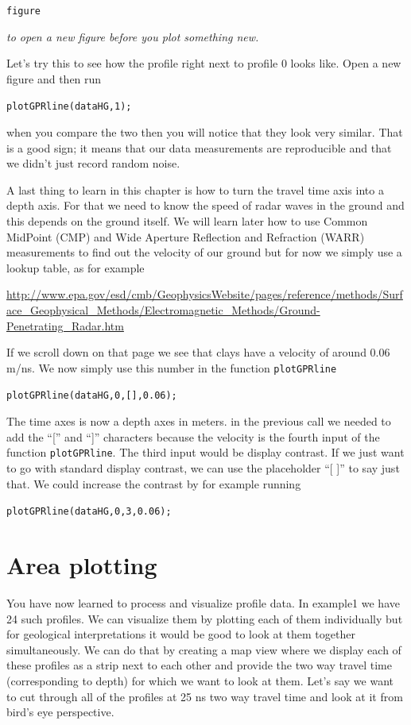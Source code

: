 \documentclass[11pt]{article}
\begin{document}
\qquad \verb#figure#

\emph{to open a new figure before you plot something new.}

Let's try this to see how the profile right next to profile 0 looks
like. Open a new figure and then run

\qquad \verb#plotGPRline(dataHG,1);#
   
when you compare the two then you will notice that they look very
similar. That is a good sign; it means that our data measurements are
reproducible and that we didn't just record random noise.
  
A last thing to learn in this chapter is how to turn the travel time
axis into a depth axis. For that we need to know the speed of radar
waves in the ground and this depends on the ground itself. We will
learn later how to use Common MidPoint (CMP) and Wide Aperture
Reflection and Refraction (WARR) measurements to find out the velocity
of our ground but for now we simply use a lookup table, as for example
  
\url{http://www.epa.gov/esd/cmb/GeophysicsWebsite/pages/reference/methods/Surface_Geophysical_Methods/Electromagnetic_Methods/Ground-Penetrating_Radar.htm}
  
If we scroll down on that page we see that clays have a velocity of
around 0.06 m/ns. We now simply use this number in the function
\verb#plotGPRline#
  
\qquad \verb#plotGPRline(dataHG,0,[],0.06);#
  
The time axes is now a depth axes in meters. in the previous call we
needed to add the ``['' and ``]'' characters because the velocity is
the fourth input of the function \verb#plotGPRline#. The third input
would be display contrast. If we just want to go with standard display
contrast, we can use the placeholder ``[ ]'' to say just that. We
could increase the contrast by for example running
  
\qquad \verb#plotGPRline(dataHG,0,3,0.06);#

\section{Area plotting}

You have now learned to process and visualize profile data. In
example1 we have 24 such profiles. We can visualize them by plotting
each of them individually but for geological interpretations it would
be good to look at them together simultaneously. We can do that by
creating a map view where we display each of these profiles as a strip
next to each other and provide the two way travel time (corresponding
to depth) for which we want to look at them. Let's say we want to cut
through all of the profiles at 25 ns two way travel time and look at
it from bird's eye perspective.
\end{document}
